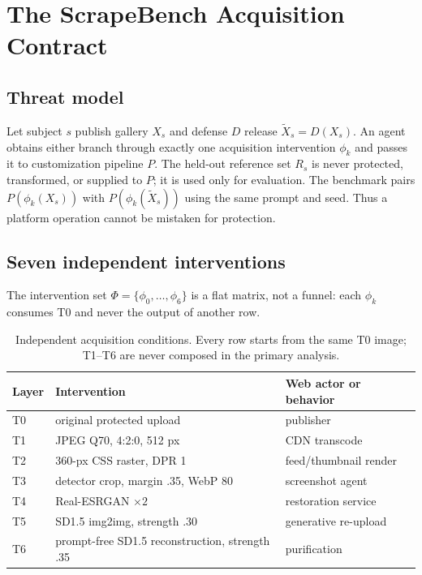\section{The ScrapeBench Acquisition Contract}
\label{sec:method}

\subsection{Threat model}
Let subject $s$ publish gallery $X_s$ and defense $D$ release
$\widetilde{X}_s=D(X_s)$. An agent obtains either branch through exactly one
acquisition intervention $\phi_k$ and passes it to customization pipeline $P$.
The held-out reference set $R_s$ is never protected, transformed, or supplied to
$P$; it is used only for evaluation. The benchmark pairs
$P(\phi_k(X_s))$ with $P(\phi_k(\widetilde{X}_s))$ using the same prompt and
seed. Thus a platform operation cannot be mistaken for protection.



\subsection{Seven independent interventions}
\label{sec:interventions}
The intervention set $\Phi=\{\phi_0,\ldots,\phi_6\}$ is a flat matrix, not a
funnel: each $\phi_k$ consumes T0 and never the output of another row.

\begin{table}[t]
\centering
\caption{Independent acquisition conditions. Every row starts from the same T0
image; T1--T6 are never composed in the primary analysis.}
\label{tab:interventions}
\footnotesize
\setlength{\tabcolsep}{3pt}
\begin{tabular}{@{}lll@{}}
\toprule
Layer & Intervention & Web actor or behavior \\
\midrule
T0 & original protected upload & publisher \\
T1 & JPEG Q70, 4:2:0, 512 px & CDN transcode \\
T2 & 360-px CSS raster, DPR 1 & feed/thumbnail render \\
T3 & detector crop, margin .35, WebP 80 & screenshot agent \\
T4 & Real-ESRGAN $\times2$ & restoration service \\
T5 & SD1.5 img2img, strength .30 & generative re-upload \\
T6 & prompt-free SD1.5 reconstruction, strength .35 & purification \\
\bottomrule
\end{tabular}
\end{table}

